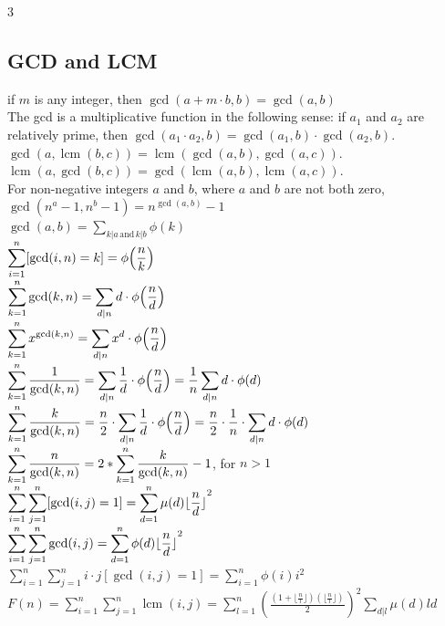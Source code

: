 \begin{multicols*}{3}
\subsection{GCD and LCM}
if $m$ is any integer, then $\displaystyle \gcd(a + m {\cdot} b, b) = \gcd(a, b)$ \\
The gcd is a multiplicative function in the following sense: if $\displaystyle a_1$ and $\displaystyle a_2$ are relatively prime, then $\displaystyle \gcd(a_1 \cdot a_2, b) = \gcd(a_1, b) \cdot \gcd(a_2,b )$. \\
$\displaystyle \gcd(a, \operatorname{lcm}(b, c)) = \operatorname{lcm}(\gcd(a, b), \gcd(a, c))$. \\
$\displaystyle \operatorname{lcm}(a, \gcd(b, c)) = \gcd(\operatorname{lcm}(a, b), \operatorname{lcm}(a, c))$. \\
For non-negative integers $\displaystyle a$ and $b$, where $\displaystyle a$ and $b$ are not both zero, $\displaystyle \gcd({n^a} - 1, {n^b} - 1) = n^{\gcd(a,b)} - 1$ \\
$\displaystyle \gcd(a, b) = \displaystyle \sum_{k|a \, \text{and} \, k|b} {\phi(k)}$ \\
$\displaystyle \displaystyle \sum_{i=1}^n [\gcd(i, n) = k] = { \phi{\left(\frac{n}{k}\right)}}$ \\
$\displaystyle \displaystyle \sum_{k=1}^n \gcd(k, n) = \displaystyle \sum_{d|n} d \cdot {\phi{\left(\frac{n}{d}\right)}}$ \\
$\displaystyle \displaystyle \sum_{k=1}^n x^{\gcd(k,n)} = \displaystyle \sum_{d|n} x^d \cdot {\phi{\left(\frac{n}{d}\right)}}$ \\
$\displaystyle \displaystyle \sum_{k=1}^n \frac{1}{\gcd(k, n)} = \displaystyle \sum_{d|n} \frac{1}{d} \cdot {\phi{\left(\frac{n}{d}\right)}} = \frac{1}{n} \displaystyle \sum_{d|n} d \cdot \phi(d)$ \\
$\displaystyle \displaystyle \sum_{k=1}^n \frac{k}{\gcd(k, n)} = \frac{n}{2} \cdot \displaystyle \sum_{d|n} \frac{1}{d} \cdot {\phi{\left(\frac{n}{d}\right)}} = \frac{n}{2} \cdot \frac{1}{n} \cdot \displaystyle \sum_{d|n} d \cdot \phi(d)$ \\
$\displaystyle \displaystyle \sum_{k=1}^n \frac{n}{\gcd(k, n)} = 2 * \displaystyle \sum_{k=1}^n \frac{k}{\gcd(k, n)} - 1$, for $n > 1$ \\
$\displaystyle \displaystyle \sum_{i=1}^n \sum_{j=1}^n [\gcd(i, j) = 1] = \displaystyle \sum_{d=1}^n \mu(d) \lfloor {\frac{n}{d} \rfloor}^2$ \\
$\displaystyle \displaystyle \sum_{i=1}^n \displaystyle\sum_{j=1}^n \gcd(i, j) = \displaystyle \sum_{d=1}^n \phi(d) \lfloor {\frac{n}{d} \rfloor}^2$ \\
$\displaystyle \sum_{i=1}^n \sum_{j=1}^n i \cdot j[\gcd(i, j) = 1] = \sum_{i=1}^n \phi(i)i^2$ \\
$\displaystyle F(n) = \displaystyle \sum_{i=1}^n \displaystyle \sum_{j=1}^n \operatorname{lcm}(i, j) = \displaystyle \sum_{l=1}^n {\left(\frac{\left( 1 + \lfloor{\frac{n}{l} \rfloor} \right) \left( \lfloor{\frac{n}{l} \rfloor} \right)} {2} \right)}^2 \displaystyle \sum_{d|l} \mu(d)ld$ \\


\end{multicols*}
